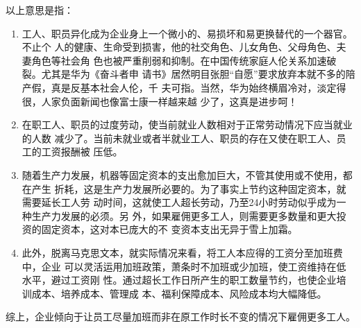 以上意思是指：
\begin{enumerate}
\item 工人、职员异化成为企业身上一个微小的、易损坏和易更换替代的一个器官。不止个
  人的健康、生命受到损害，他的社交角色、儿女角色、父母角色、夫妻角色等社会角
  色也被严重削弱和抑制。在中国传统家庭人伦关系加速破裂。尤其是华为《奋斗者申
  请书》居然明目张胆“自愿”要求放弃本就不多的陪产假，真是反基本社会人伦，千
  夫可指。当然，华为始终横眉冷对，淡定得很，人家负面新闻也像富士康一样越来越
  少了，这真是进步呵！

\item 在职工人、职员的过度劳动，使当前就业人数相对于正常劳动情况下应当就业的人数
  减少了。当前未就业或者半就业工人、职员的存在又使在职工人、员工的工资报酬被
  压低。

\item 随着生产力发展，机器等固定资本的支出愈加巨大，不管其使用或不使用，都在产生
  折耗，这是生产力发展所必要的。为了事实上节约这种固定资本，就需要延长工人劳
  动时间，这就使工人超长劳动，乃至24小时劳动似乎成为一种生产力发展的必须。另
  外，如果雇佣更多工人，则需要更多数量和更大投资的固定资本，这对本已庞大的不
  变资本支出无异于雪上加霜。

\item 此外，脱离马克思文本，就实际情况来看，将工人本应得的工资分至加班费中，企业
  可以灵活运用加班政策，萧条时不加班或少加班，使工资维持在低水平，避过工资刚
  性。通过超长工作日所产生的职工数量节约，也使企业培训成本、培养成本、管理成
  本、福利保障成本、风险成本均大幅降低。
\end{enumerate}

综上，企业倾向于让员工尽量加班而非在原工作时长不变的情况下雇佣更多工人。





